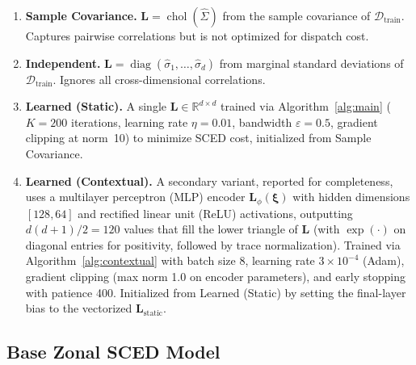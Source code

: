 \documentclass[11pt]{article}
\newcommand{\R}{\mathbb{R}}
\newcommand{\cD}{\mathcal{D}}
\newcommand{\bxi}{\bm{\xi}}
\newcommand{\bL}{\bm{L}}
\DeclareMathOperator{\diag}{diag}
\DeclareMathOperator{\chol}{chol}
\theoremstyle{definition}
\begin{document}
\begin{enumerate}
\item \textbf{Sample Covariance.} $\bL = \chol(\hat\Sigma)$ from the sample covariance of $\cD_{\text{train}}$. Captures pairwise correlations but is not optimized for dispatch cost.

\item \textbf{Independent.} $\bL = \diag(\hat\sigma_1, \ldots, \hat\sigma_d)$ from marginal standard deviations of $\cD_{\text{train}}$. Ignores all cross-dimensional correlations.

\item \textbf{Learned (Static).} A single $\bL \in \R^{d \times d}$ trained via Algorithm~\ref{alg:main} ($K = 200$ iterations, learning rate $\eta = 0.01$, bandwidth $\varepsilon = 0.5$, gradient clipping at norm~10) to minimize SCED cost, initialized from Sample Covariance.

\item \textbf{Learned (Contextual).} A secondary variant, reported for completeness, uses a multilayer perceptron (MLP) encoder $\bL_\phi(\bxi)$ with hidden dimensions $[128, 64]$ and rectified linear unit (ReLU) activations, outputting $d(d+1)/2 = 120$ values that fill the lower triangle of $\bL$ (with $\exp(\cdot)$ on diagonal entries for positivity, followed by trace normalization). Trained via Algorithm~\ref{alg:contextual} with batch size 8, learning rate $3 \times 10^{-4}$ (Adam), gradient clipping (max norm 1.0 on encoder parameters), and early stopping with patience 400. Initialized from Learned (Static) by setting the final-layer bias to the vectorized $\bL_{\mathrm{static}}$.
\end{enumerate}

\subsection{Base Zonal SCED Model}
\end{document}
